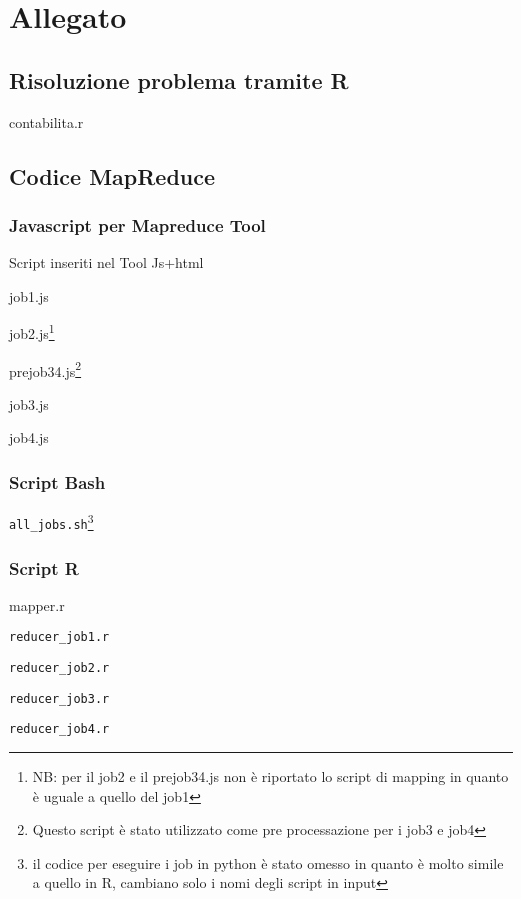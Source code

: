\section*{Allegato}
\subsection*{Risoluzione problema tramite R}
contabilita.r

\subsection*{Codice MapReduce}
\subsubsection*{Javascript per Mapreduce Tool}
Script inseriti nel Tool Js+html

job1.js

job2.js\footnote{NB: per il job2 e il prejob34.js non è riportato lo script di mapping in quanto è uguale a quello del job1}

prejob34.js\footnote{Questo script è stato utilizzato come pre processazione per i job3 e job4}

job3.js

job4.js

\subsubsection*{Script Bash}
\texttt{all\_jobs.sh}\footnote{il codice per eseguire i job in python è stato omesso in quanto è molto simile a quello in R, cambiano solo i nomi degli script in input}


\subsubsection*{Script R}
mapper.r

\texttt{reducer\_job1.r}

\texttt{reducer\_job2.r}

\texttt{reducer\_job3.r}

\texttt{reducer\_job4.r}

